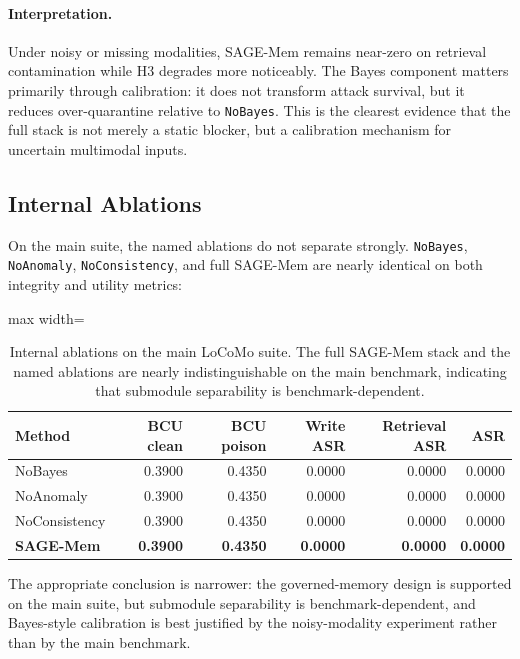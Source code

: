 \documentclass{article}
\begin{document}
\paragraph{Interpretation.}
Under noisy or missing modalities, SAGE-Mem remains near-zero on retrieval contamination while H3 degrades more noticeably. The Bayes component matters primarily through calibration: it does not transform attack survival, but it reduces over-quarantine relative to \texttt{NoBayes}. This is the clearest evidence that the full stack is not merely a static blocker, but a calibration mechanism for uncertain multimodal inputs.

\subsection{Internal Ablations}

On the main suite, the named ablations do not separate strongly. \texttt{NoBayes}, \texttt{NoAnomaly}, \texttt{NoConsistency}, and full SAGE-Mem are nearly identical on both integrity and utility metrics:

\begin{table}[t]
\centering
\small
\setlength{\tabcolsep}{4pt}
\renewcommand{\arraystretch}{0.96}
\begin{adjustbox}{max width=\columnwidth}
\begin{tabular}{lrrrrr}
\toprule
Method & BCU clean & BCU poison & Write ASR & Retrieval ASR & ASR \\
\midrule
NoBayes & 0.3900 & 0.4350 & 0.0000 & 0.0000 & 0.0000 \\
NoAnomaly & 0.3900 & 0.4350 & 0.0000 & 0.0000 & 0.0000 \\
NoConsistency & 0.3900 & 0.4350 & 0.0000 & 0.0000 & 0.0000 \\
\textbf{SAGE-Mem} & \textbf{0.3900} & \textbf{0.4350} & \textbf{0.0000} & \textbf{0.0000} & \textbf{0.0000} \\
\bottomrule
\end{tabular}
\end{adjustbox}
\caption{Internal ablations on the main LoCoMo suite. The full SAGE-Mem stack and the named ablations are nearly indistinguishable on the main benchmark, indicating that submodule separability is benchmark-dependent.}
\label{tab:locomo-ablations}
\end{table}


The appropriate conclusion is narrower: the governed-memory design is supported on the main suite, but submodule separability is benchmark-dependent, and Bayes-style calibration is best justified by the noisy-modality experiment rather than by the main benchmark.
\end{document}
